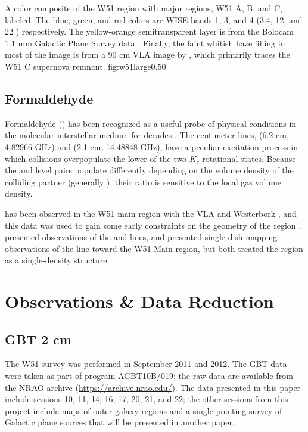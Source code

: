 {A color composite of the W51 region with major regions, W51 A, B, and C,
labeled.  The blue, green, and red colors are WISE bands 1, 3, and 4 (3.4, 12,
and 22 \um) respectively.  The yellow-orange semitransparent layer is from the
Bolocam 1.1 mm Galactic Plane Survey data \citep{Aguirre2011a,Ginsburg2013a}.
Finally, the faint whitish haze filling in most of the image is from a 90 cm
VLA image by \citet{Brogan2013a}, which primarily traces the W51 C supernova
remnant.}
{fig:w51large}{0.5}{0}


\subsection{Formaldehyde}
Formaldehyde (\formaldehyde) has been recognized as a useful probe of physical
conditions in the molecular interstellar medium for decades
\citep{Mangum1993a}.  The centimeter lines, \formaldehyde \oneone (6.2 cm,
4.82966 GHz) and \twotwo (2.1 cm, 14.48848 GHz), have a peculiar excitation
process in which collisions overpopulate the lower of the two $K_c$ rotational
states.  Because the \oneone and \twotwo level pairs populate differently
depending on the volume density of the colliding partner (generally \hh), their
ratio is sensitive to the local gas volume density.

\formaldehyde \oneone has been observed in the W51 main region with the VLA
\citep{Martin-Pintado1985a} and Westerbork \citep{Arnal1985a}, and this data
was used to gain some early constraints on the geometry of the region
\citep[e.g.][]{Carpenter1998a}.  \citet{Henkel1980a} presented observations of
the \oneone and \twotwo lines, and \citet{Martin-Pintado1985b} presented
single-dish mapping observations of the \formaldehyde \twotwo line toward the
W51 Main region, but both treated the region as a single-density structure.



\section{Observations \& Data Reduction}

\subsection{GBT 2 cm}
The W51 survey was performed in September 2011 and 2012.  The GBT data were
taken as part of program AGBT10B/019; the raw data are available from the NRAO
archive (\url{https://archive.nrao.edu/}).  The data presented in this paper
include sessions 10, 11, 14, 16, 17, 20, 21, and 22; the other sessions from
this project include maps of outer galaxy regions and a single-pointing survey
of Galactic plane sources that will be presented in another paper. 

